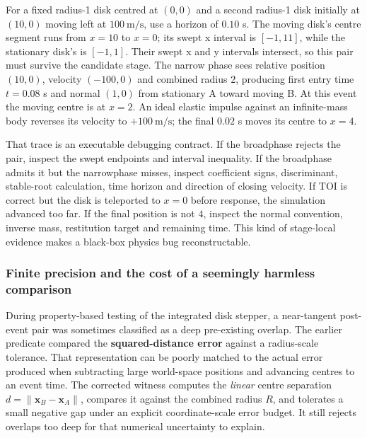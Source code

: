 \hypertarget{04-visual-computing-ii-ch026-a-numerical-debugging-trace-find-the-stage-that-lost-the-collision}{}

For a fixed radius-1 disk centred at \((0,0)\) and a second radius-1 disk initially at \((10,0)\) moving left at \(100\ \mathrm{m/s}\), use a horizon of \(0.10\) s. The moving disk's centre segment runs from \(x=10\) to \(x=0\); its swept x interval is \([-1,11]\), while the stationary disk's is \([-1,1]\). Their swept x and y intervals intersect, so this pair must survive the candidate stage. The narrow phase sees relative position \((10,0)\), velocity \((-100,0)\) and combined radius \(2\), producing first entry time \(t=0.08\) s and normal \((1,0)\) from stationary A toward moving B. At this event the moving centre is at \(x=2\). An ideal elastic impulse against an infinite-mass body reverses its velocity to \(+100\ \mathrm{m/s}\); the final \(0.02\) s moves its centre to \(x=4\).

That trace is an executable debugging contract. If the broadphase rejects the pair, inspect the swept endpoints and interval inequality. If the broadphase admits it but the narrowphase misses, inspect coefficient signs, discriminant, stable-root calculation, time horizon and direction of closing velocity. If TOI is correct but the disk is teleported to \(x=0\) before response, the simulation advanced too far. If the final position is not \(4\), inspect the normal convention, inverse mass, restitution target and remaining time. This kind of stage-local evidence makes a black-box physics bug reconstructable.

\subsubsection{Finite precision and the cost of a seemingly harmless comparison}\label{04-visual-computing-ii-ch026-finite-precision-and-the-cost-of-a-seemingly-harmless-comparison}

\hypertarget{04-visual-computing-ii-ch026-finite-precision-and-the-cost-of-a-seemingly-harmless-comparison}{}

During property-based testing of the integrated disk stepper, a near-tangent post-event pair was sometimes classified as a deep pre-existing overlap. The earlier predicate compared the \textbf{squared-distance error} against a radius-scale tolerance. That representation can be poorly matched to the actual error produced when subtracting large world-space positions and advancing centres to an event time. The corrected witness computes the \emph{linear} centre separation \(d=\|\mathbf x_B-\mathbf x_A\|\), compares it against the combined radius \(R\), and tolerates a small negative gap under an explicit coordinate-scale error budget. It still rejects overlaps too deep for that numerical uncertainty to explain.

